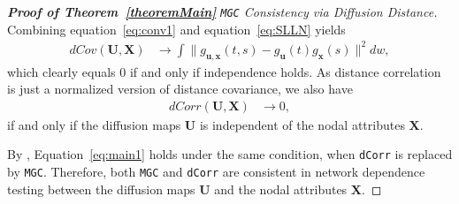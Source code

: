 \documentclass[11pt]{article}
\theoremstyle{definition}
\begin{document}
\begin{proof}[\textbf{Proof of Theorem~\ref{theoremMain}} \texttt{MGC} Consistency via Diffusion Distance]
Combining equation~\ref{eq:conv1} and equation~\ref{eq:SLLN} yields
\begin{eqnarray}
dCov(\mathbf{U},\mathbf{X}) &\longrightarrow \displaystyle\int{\|g_{\mathbf{u},\mathbf{x}}(t,s)-g_{\mathbf{u}}(t)g_{\mathbf{x}}(s)\|^{2}}dw,
\label{eq:main2}
\end{eqnarray}
which clearly equals $0$ if and only if independence holds. As distance correlation is just a normalized version of distance covariance, we also have 
\begin{eqnarray}
dCorr(\mathbf{U},\mathbf{X}) &\longrightarrow 0,
\label{eq:main1}
\end{eqnarray}
if and only if the diffusion maps $\mathbf{U}$ is independent of the nodal attributes $\mathbf{X}$.

By \cite{shen2016discovering}, Equation~\ref{eq:main1} holds under the same condition, when \texttt{dCorr} is replaced by \texttt{MGC}. Therefore, both \texttt{MGC} and \texttt{dCorr} are consistent in network dependence testing between the diffusion maps $\mathbf{U}$ and the nodal attributes $\mathbf{X}$.
\end{proof}
	
\end{document}
